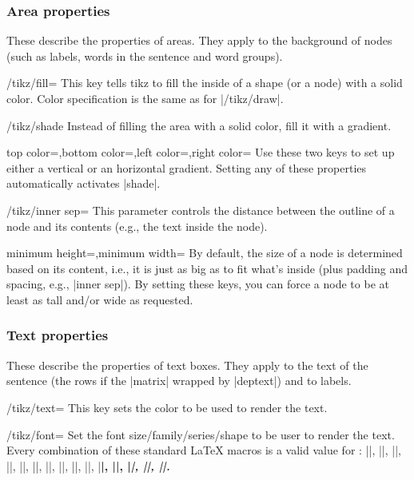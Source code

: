 \documentclass[a4paper]{ltxdoc}
\begin{document}
\subsubsection{Area properties}
These describe the properties of areas. They apply to the background of nodes (such as labels, words in the sentence and word groups).
\begin{key}{/tikz/fill=}
   This key tells tikz to fill the inside of a shape (or a node) with a solid color. Color specification is the same as for |/tikz/draw|.
\end{key}
\begin{key}{/tikz/shade}
   Instead of filling the area with a solid color, fill it with a gradient.
\end{key}
\begin{keylist}[/tikz]{top color=,bottom color=,left color=,right color=}
   Use these two keys to set up either a vertical or an horizontal gradient. Setting any of these properties automatically activates |shade|.
\end{keylist}
\begin{key}{/tikz/inner sep=}
   This parameter controls the distance between the outline of a node and its contents (e.g., the text inside the node).
\end{key}
\begin{keylist}[/tikz]{minimum height=,minimum width=}
   By default, the size of a node is determined based on its content, i.e., it is just as big as to fit what's inside (plus padding and spacing, e.g., |inner sep|). By setting these keys, you can force a node to be at least as tall and/or wide as requested.
\end{keylist}

\subsubsection{Text properties}
These describe the properties of text boxes. They apply to the text of the sentence (the rows if the |matrix| wrapped by |deptext|) and to labels.
\begin{key}{/tikz/text=}
   This key sets the color to be used to render the text.
\end{key}
\begin{key}{/tikz/font=}
   Set the font size/family/series/shape to be user to render the text. Every combination of these standard \LaTeX{} macros is a valid value for :
   |\normalsize|,
   |\small|,
   |\footnotesize|,
   |\tiny|,
   |\large|,
   |\huge|,
   |\rmfamily|,
   |\ttfamily|,
   |\sffamily|,
   |\mdseries|,
   |\bfseries|,
   |\upshape|,
   |\itshape|,
   |\scshape|,
   |\slshape|.
\end{key}

\printindex
\end{document}
